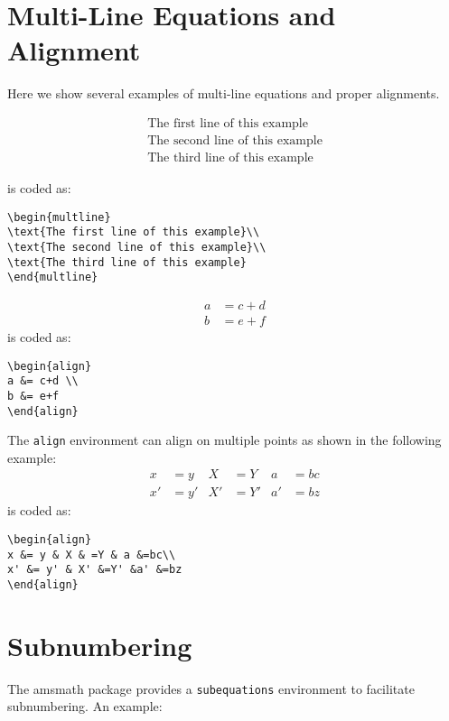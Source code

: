\documentclass[lettersize,journal]{IEEEtran}
\begin{document}
\section{Multi-Line Equations and Alignment}
Here we show several examples of multi-line equations and proper alignments.

\begin{multline}
\text{The first line of this example}\\
\text{The second line of this example}\\
\text{The third line of this example}
\end{multline}

\noindent is coded as:
\begin{verbatim}
\begin{multline}
\text{The first line of this example}\\
\text{The second line of this example}\\
\text{The third line of this example}
\end{multline}
\end{verbatim}

\begin{align}
a &= c+d \\
b &= e+f
\end{align}
\noindent is coded as:
\begin{verbatim}
\begin{align}
a &= c+d \\
b &= e+f
\end{align}
\end{verbatim}

The {\tt{align}} environment can align on multiple  points as shown in the following example:
\begin{align}
x &= y & X & =Y & a &=bc\\
x' &= y' & X' &=Y' &a' &=bz
\end{align}
\noindent is coded as:
\begin{verbatim}
\begin{align}
x &= y & X & =Y & a &=bc\\
x' &= y' & X' &=Y' &a' &=bz
\end{align}
\end{verbatim}

\section{Subnumbering}
The amsmath package provides a {\tt{subequations}} environment to facilitate subnumbering. An example:
\end{document}

